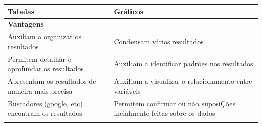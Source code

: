 \documentclass[
]{book}
\begin{document}
\begin{longtable}[]{@{}ll@{}}
\toprule
\begin{minipage}[b]{0.47\columnwidth}\raggedright
Tabelas\strut
\end{minipage} & \begin{minipage}[b]{0.47\columnwidth}\raggedright
Gráficos\strut
\end{minipage}\tabularnewline
\midrule
\endhead
\begin{minipage}[t]{0.47\columnwidth}\raggedright
\textbf{Vantagens}\strut
\end{minipage} & \begin{minipage}[t]{0.47\columnwidth}\raggedright
\strut
\end{minipage}\tabularnewline
\begin{minipage}[t]{0.47\columnwidth}\raggedright
Auxiliam a organizar os resultados\strut
\end{minipage} & \begin{minipage}[t]{0.47\columnwidth}\raggedright
Condensam vários resultados\strut
\end{minipage}\tabularnewline
\begin{minipage}[t]{0.47\columnwidth}\raggedright
Permitem detalhar e aprofundar os resultados\strut
\end{minipage} & \begin{minipage}[t]{0.47\columnwidth}\raggedright
Auxiliam a identificar padrões nos resultados\strut
\end{minipage}\tabularnewline
\begin{minipage}[t]{0.47\columnwidth}\raggedright
Apresentam os resultados de maneira mais precisa\strut
\end{minipage} & \begin{minipage}[t]{0.47\columnwidth}\raggedright
Auxiliam a visualizar o relacionamento entre variáveis\strut
\end{minipage}\tabularnewline
\begin{minipage}[t]{0.47\columnwidth}\raggedright
Buscadores (google, etc) encontram os resultados\strut
\end{minipage} & \begin{minipage}[t]{0.47\columnwidth}\raggedright
Permitem confirmar ou não suposiÇões incialmente feitas sobre os
dados\strut
\end{minipage}\tabularnewline
\begin{minipage}[t]{0.47\columnwidth}\raggedright
\strut
\end{minipage} & \begin{minipage}[t]{0.47\columnwidth}\raggedright

\end{minipage}
\end{longtable}
\end{document}
